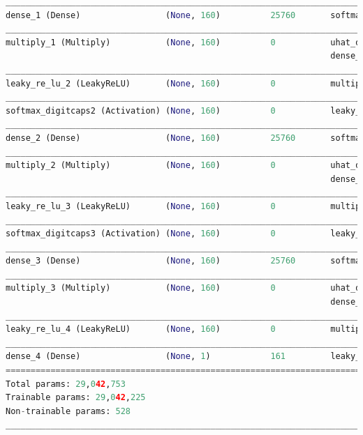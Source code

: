 \begin{lstlisting}[basicstyle=\scriptsize,language=Python]
__________________________________________________________________________________________________
dense_1 (Dense)                 (None, 160)          25760       softmax_digitcaps1[0][0]         
__________________________________________________________________________________________________
multiply_1 (Multiply)           (None, 160)          0           uhat_digitcaps[0][0]             
                                                                 dense_1[0][0]                    
__________________________________________________________________________________________________
leaky_re_lu_2 (LeakyReLU)       (None, 160)          0           multiply_1[0][0]                 
__________________________________________________________________________________________________
softmax_digitcaps2 (Activation) (None, 160)          0           leaky_re_lu_2[0][0]              
__________________________________________________________________________________________________
dense_2 (Dense)                 (None, 160)          25760       softmax_digitcaps2[0][0]         
__________________________________________________________________________________________________
multiply_2 (Multiply)           (None, 160)          0           uhat_digitcaps[0][0]             
                                                                 dense_2[0][0]                    
__________________________________________________________________________________________________
leaky_re_lu_3 (LeakyReLU)       (None, 160)          0           multiply_2[0][0]                 
__________________________________________________________________________________________________
softmax_digitcaps3 (Activation) (None, 160)          0           leaky_re_lu_3[0][0]              
__________________________________________________________________________________________________
dense_3 (Dense)                 (None, 160)          25760       softmax_digitcaps3[0][0]         
__________________________________________________________________________________________________
multiply_3 (Multiply)           (None, 160)          0           uhat_digitcaps[0][0]             
                                                                 dense_3[0][0]                    
__________________________________________________________________________________________________
leaky_re_lu_4 (LeakyReLU)       (None, 160)          0           multiply_3[0][0]                 
__________________________________________________________________________________________________
dense_4 (Dense)                 (None, 1)            161         leaky_re_lu_4[0][0]              
==================================================================================================
Total params: 29,042,753
Trainable params: 29,042,225
Non-trainable params: 528
__________________________________________________________________________________________________
\end{lstlisting}

